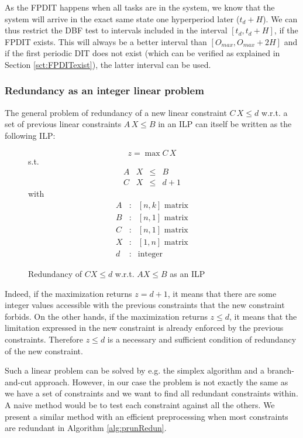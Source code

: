 \documentclass[conference]{IEEEtran}
\begin{document}
As the FPDIT happens when all tasks are in the system, we know that the system will arrive in the exact same state one hyperperiod later ($t_d + H$). We can thus restrict the DBF test to intervals included in the interval $[t_d, t_d + H]$, if the FPDIT exists. This will always be a better interval than $[O_{max}, O_{max} + 2H]$ and if the first periodic DIT does not exist (which can be verified as explained in Section \ref{sct:FPDITexist}), the latter interval can be used.

\subsubsection{Redundancy as an integer linear problem}

The general problem of redundancy of a new linear constraint $C \, X \leq d$ w.r.t. a set of previous linear constraints $A \, X \leq B$ in an ILP can itself be written as the following ILP:

\begin{figure}[h]
$$z = \max C \, X$$
s.t.
\[
\begin{array}{rccc}
  A & X &\leq & B \\
  C & X &\leq & d + 1
\end{array}
\]
with
\[
  \begin{array}{ccc}
    A & : & [n,k] \text{ matrix}\\
    B & : & [n,1] \text{ matrix}\\
    C & : & [n,1] \text{ matrix}\\
    X & : & [1,n] \text{ matrix}\\
    d & : & \text{integer}
  \end{array}
\]
\caption{Redundancy of $CX \leq d$ w.r.t. $A X \leq B$ as an ILP}
\end{figure}

Indeed, if the maximization returns $z=d+1$, it means that there are some integer values accessible with the previous constraints that the new constraint forbids. On the other hands, if the maximization returns $z \leq d$, it means that the limitation expressed in the new constraint is already enforced by the previous constraints. Therefore $z \leq d$ is a necessary and sufficient condition of redundancy of the new constraint.

Such a linear problem can be solved by e.g. the simplex algorithm and a branch-and-cut approach. However, in our case the problem is not exactly the same as we have a set of constraints and we want to find all redundant constraints within. A naive method would be to test each constraint against all the others. We present a similar method with an efficient preprocessing when most constraints are redundant in Algorithm \ref{alg:prunRedun}.
\end{document}
